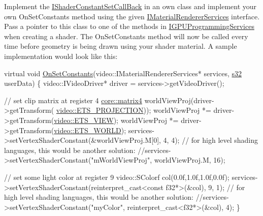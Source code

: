 Implement the \hyperlink{classirr_1_1video_1_1IShaderConstantSetCallBack}{I\+Shader\+Constant\+Set\+Call\+Back} in an own class and implement your own On\+Set\+Constants method using the given \hyperlink{classirr_1_1video_1_1IMaterialRendererServices}{I\+Material\+Renderer\+Services} interface. Pass a pointer to this class to one of the methods in \hyperlink{classirr_1_1video_1_1IGPUProgrammingServices}{I\+G\+P\+U\+Programming\+Services} when creating a shader. The On\+Set\+Constants method will now be called every time before geometry is being drawn using your shader material. A sample implementation would look like this\+: 
\begin{DoxyCode}
\textcolor{keyword}{virtual} \textcolor{keywordtype}{void} \hyperlink{classirr_1_1video_1_1IShaderConstantSetCallBack_a91cf4eb8d20d278defaca4e3c9390396}{OnSetConstants}(video::IMaterialRendererServices* services, 
      \hyperlink{namespaceirr_ac66849b7a6ed16e30ebede579f9b47c6}{s32} userData)
\{
    video::IVideoDriver* driver = services->getVideoDriver();

    \textcolor{comment}{// set clip matrix at register 4}
    \hyperlink{namespaceirr_1_1core_a73fa92e638c5ca97efd72da307cc9b65}{core::matrix4} worldViewProj(driver->getTransform(
      \hyperlink{namespaceirr_1_1video_a15b57657a320243be03ae6f66fcff43dae7ec186418508c67a7562af012d7b63f}{video::ETS\_PROJECTION}));
    worldViewProj *= driver->getTransform(\hyperlink{namespaceirr_1_1video_a15b57657a320243be03ae6f66fcff43da152f4262d5874186e0288934c7d31e14}{video::ETS\_VIEW});
    worldViewProj *= driver->getTransform(\hyperlink{namespaceirr_1_1video_a15b57657a320243be03ae6f66fcff43da843cf42adb3fa9caf61c9e228cf14e85}{video::ETS\_WORLD});
    services->setVertexShaderConstant(&worldViewProj.M[0], 4, 4);
    \textcolor{comment}{// for high level shading languages, this would be another solution:}
    \textcolor{comment}{//services->setVertexShaderConstant("mWorldViewProj", worldViewProj.M, 16);}

    \textcolor{comment}{// set some light color at register 9}
    video::SColorf col(0.0f,1.0f,1.0f,0.0f);
    services->setVertexShaderConstant(reinterpret\_cast<const f32*>(&col), 9, 1);
    \textcolor{comment}{// for high level shading languages, this would be another solution:}
    \textcolor{comment}{//services->setVertexShaderConstant("myColor", reinterpret\_cast<f32*>(&col), 4);}
\}
\end{DoxyCode}
 
